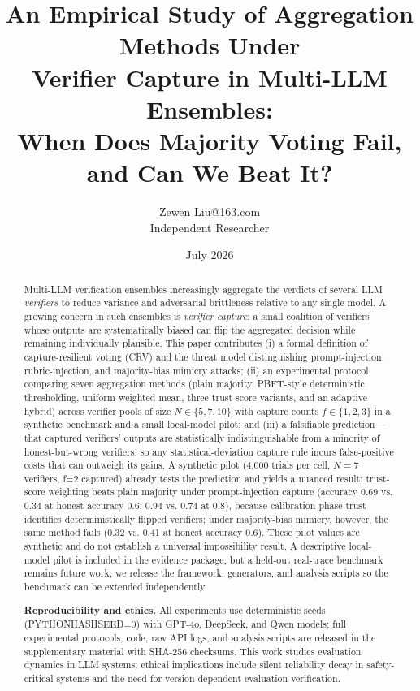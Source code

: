 \documentclass[11pt]{article}
\title{An Empirical Study of Aggregation Methods Under\\
       Verifier Capture in Multi-LLM Ensembles:\\
       When Does Majority Voting Fail, and Can We Beat It?}
\author{\name Zewen Liu\email 17353895263@163.com\\\addr Independent Researcher}
\date{July 2026}
\begin{document}
\maketitle

\begin{abstract}
Multi-LLM verification ensembles increasingly aggregate the verdicts of
several LLM \emph{verifiers} to reduce variance and adversarial
brittleness relative to any single model. A growing concern in such
ensembles is \emph{verifier capture}: a small coalition of verifiers
whose outputs are systematically biased can flip the aggregated
decision while remaining individually plausible. This paper contributes
(i) a formal definition of capture-resilient voting (\textsc{CRV}) and
the threat model distinguishing prompt-injection, rubric-injection, and
majority-bias mimicry attacks; (ii) an experimental
protocol comparing seven aggregation methods (plain majority,
PBFT-style deterministic thresholding, uniform-weighted mean, three
trust-score variants, and an adaptive hybrid) across verifier pools of
size $N \in \{5,7,10\}$ with capture counts $f \in \{1,2,3\}$ in a
synthetic benchmark and a small local-model pilot; and (iii) a falsifiable prediction---that captured verifiers'
outputs are statistically indistinguishable from a minority of
honest-but-wrong verifiers, so any statistical-deviation capture rule
incurs false-positive costs that can outweigh its gains. A synthetic pilot (4,000 trials per cell, $N=7$ verifiers,
f=2 captured) already tests the prediction and yields a nuanced result:
trust-score weighting beats plain majority under prompt-injection capture
(accuracy 0.69 vs. 0.34 at honest accuracy 0.6; 0.94 vs. 0.74 at 0.8),
because calibration-phase trust identifies deterministically flipped
verifiers; under majority-bias mimicry, however, the same method fails
(0.32 vs. 0.41 at honest accuracy 0.6). These pilot values are synthetic and
do not establish a universal impossibility result. A descriptive local-model
pilot is included in the evidence package, but a held-out real-trace benchmark
remains future work; we release the framework, generators, and analysis
scripts so the benchmark can be extended independently.


\textbf{Reproducibility and ethics.} All experiments use deterministic seeds (PYTHONHASHSEED=0) with GPT-4o, DeepSeek, and Qwen models; full experimental protocols, code, raw API logs, and analysis scripts are released in the supplementary material with SHA-256 checksums. This work studies evaluation dynamics in LLM systems; ethical implications include silent reliability decay in safety-critical systems and the need for version-dependent evaluation verification.\end{abstract}
\end{document}
